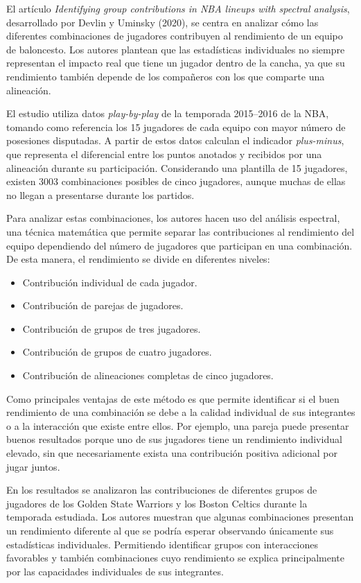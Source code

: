 El artículo \textit{Identifying group contributions in NBA lineups with spectral analysis}, desarrollado por Devlin y Uminsky (2020), se centra en analizar cómo las diferentes combinaciones de jugadores contribuyen al rendimiento de un equipo de baloncesto. Los autores plantean que las estadísticas individuales no siempre representan el impacto real que tiene un jugador dentro de la cancha, ya que su rendimiento también depende de los compañeros con los que comparte una alineación.

El estudio utiliza datos \textit{play-by-play} de la temporada 2015--2016 de la NBA, tomando como referencia los 15 jugadores de cada equipo con mayor número de posesiones disputadas. A partir de estos datos calculan el indicador \textit{plus-minus}, que representa el diferencial entre los puntos anotados y recibidos por una alineación durante su participación. Considerando una plantilla de 15 jugadores, existen 3003 combinaciones posibles de cinco jugadores, aunque muchas de ellas no llegan a presentarse durante los partidos.

Para analizar estas combinaciones, los autores hacen uso del análisis espectral, una técnica matemática que permite separar las contribuciones al rendimiento del equipo dependiendo del número de jugadores que participan en una combinación. De esta manera, el rendimiento se divide en diferentes niveles:

\begin{itemize}
    \item Contribución individual de cada jugador.
    \item Contribución de parejas de jugadores.
    \item Contribución de grupos de tres jugadores.
    \item Contribución de grupos de cuatro jugadores.
    \item Contribución de alineaciones completas de cinco jugadores.
\end{itemize}

Como principales ventajas de este método es que permite identificar si el buen rendimiento de una combinación se debe a la calidad individual de sus integrantes o a la interacción que existe entre ellos. Por ejemplo, una pareja puede presentar buenos resultados porque uno de sus jugadores tiene un rendimiento individual elevado, sin que necesariamente exista una contribución positiva adicional por jugar juntos. 

En los resultados se analizaron las contribuciones de diferentes grupos de jugadores de los Golden State Warriors y los Boston Celtics durante la temporada estudiada. Los autores muestran que algunas combinaciones presentan un rendimiento diferente al que se podría esperar observando únicamente sus estadísticas individuales. Permitiendo identificar grupos con interacciones favorables y también combinaciones cuyo rendimiento se explica principalmente por las capacidades individuales de sus integrantes.

